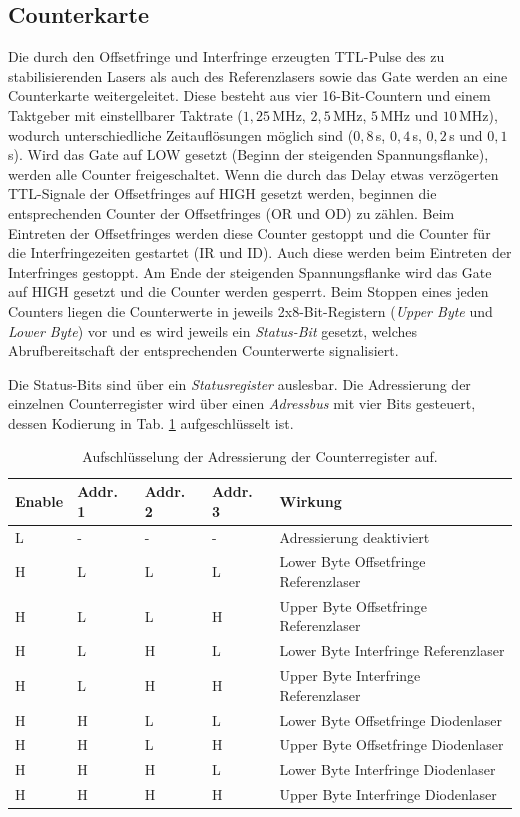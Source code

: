 \subsection{Counterkarte}\label{subsec:counterkarte}
Die durch den Offsetfringe und Interfringe erzeugten
TTL-Pulse des zu stabilisierenden Lasers als auch des Referenzlasers
sowie das Gate werden an eine Counterkarte weitergeleitet. Diese besteht aus
vier 16-Bit-Countern und einem Taktgeber mit einstellbarer Taktrate ($1,25\,$MHz,
$2,5\,$MHz, $5\,$MHz und $10\,$MHz), wodurch unterschiedliche Zeitauflösungen möglich
sind ($0,8\,$\textmu s, $0,4\,$\textmu s, $0,2\,$\textmu s und $0,1\,$\textmu
s).
Wird das Gate auf LOW gesetzt (Beginn der steigenden Spannungsflanke), werden
alle Counter freigeschaltet. Wenn die durch
das Delay etwas verzögerten TTL-Signale der Offsetfringes auf HIGH gesetzt werden, beginnen die
entsprechenden Counter der Offsetfringes (OR und OD) zu zählen. Beim Eintreten
der Offsetfringes werden diese Counter gestoppt und die Counter für die
Interfringezeiten gestartet (IR und ID). Auch diese werden beim Eintreten der
Interfringes gestoppt. Am Ende der steigenden Spannungsflanke wird das Gate auf
HIGH gesetzt und die Counter werden gesperrt. Beim Stoppen eines jeden Counters
liegen die Counterwerte in jeweils 2x8-Bit-Registern (\textit{Upper Byte} und \textit{Lower Byte}) vor und es wird jeweils ein
\textit{Status-Bit} gesetzt, welches Abrufbereitschaft der entsprechenden
Counterwerte signalisiert.\par
Die Status-Bits sind über ein \textit{Statusregister} auslesbar. Die
Adressierung der einzelnen Counterregister wird über einen \textit{Adressbus} mit vier Bits
gesteuert, dessen Kodierung in Tab. \ref{tab:adressbus_kodierung} aufgeschlüsselt ist.
\begin{table}
	\begin{tabular}{p{}p{}p{}p{}|p{}}
		\toprule
		Enable & Addr. 1 & Addr. 2 & Addr. 3 & Wirkung\\
		\midrule[1px]
		\hline
		L & - & - & - & Adressierung deaktiviert\\
		H & L & L & L & Lower Byte Offsetfringe Referenzlaser\\
		H & L & L & H & Upper Byte Offsetfringe Referenzlaser\\
		H & L & H & L & Lower Byte Interfringe Referenzlaser\\
		H & L & H & H & Upper Byte Interfringe Referenzlaser\\
		H & H & L & L & Lower Byte Offsetfringe Diodenlaser\\
		H & H & L & H & Upper Byte Offsetfringe Diodenlaser\\
		H & H & H & L & Lower Byte Interfringe Diodenlaser\\
		H & H & H & H & Upper Byte Interfringe Diodenlaser\\
		\bottomrule[1px]
	\end{tabular}
	\caption[Adressierung Counterregister]{Aufschlüsselung der Adressierung der
	Counterregister auf.}
	\label{tab:adressbus_kodierung}
\end{table}
